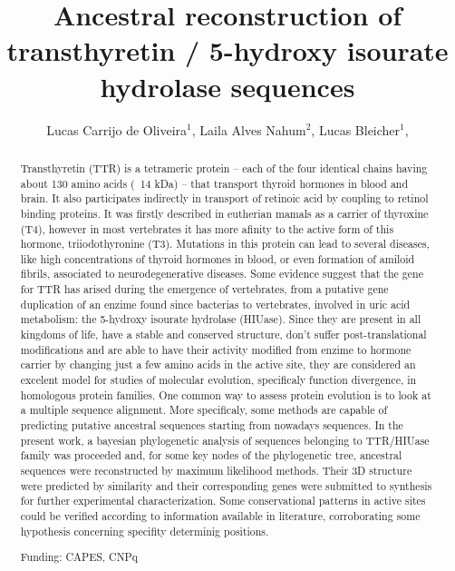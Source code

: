 \documentclass[twoside]{article}
\title{\vspace{-15mm}\fontsize{24pt}{10pt}\selectfont\textbf{ Ancestral reconstruction of transthyretin / 5-hydroxy isourate hydrolase sequences }} %
\author{ Lucas Carrijo de Oliveira$^{1}$, Laila Alves Nahum$^{2}$, Lucas Bleicher$^{1}$, }
\affil{ 1 Federal University of Minas Gerais

2 CPqRR/Fiocruz Minas

 }
\date{}
\begin{document}
  
  
  \maketitle %
  
  
  \thispagestyle{fancy} %
  
  
  \begin{abstract}
  Transthyretin (TTR) is a tetrameric protein – each of the four identical chains having about 130 amino acids (~14 kDa) –  that transport thyroid hormones in blood and brain. It also participates indirectly in transport of retinoic acid by coupling to retinol binding proteins. It was firstly described in eutherian mamals as a carrier of thyroxine (T4), however in most vertebrates it has more afinity to the active form of this hormone, triiodothyronine (T3). Mutations in this protein can lead to several diseases, like high concentrations of thyroid hormones in blood, or even formation of amiloid fibrils, associated to neurodegenerative diseases. Some evidence suggest that the gene for TTR has arised during the emergence of vertebrates, from a putative gene duplication of an enzime found since bacterias to vertebrates, involved in uric acid metabolism: the 5-hydroxy isourate hydrolase (HIUase). Since they are present in all kingdoms of life, have a stable and conserved structure, don't suffer post-translational modifications and are able to have their activity modified from enzime to hormone carrier by changing just a few amino acids in the active site, they are considered an excelent model for studies of molecular evolution, specificaly function divergence, in homologous protein families. One common way to assess protein evolution is to look at a multiple sequence alignment. More specificaly, some methods are capable of predicting putative ancestral sequences starting from nowadays sequences. In the present work, a bayesian phylogenetic analysis of sequences belonging to TTR/HIUase family was proceeded and, for some key nodes of the phylogenetic tree, ancestral sequences were reconstructed by maximum likelihood methods. Their 3D structure were predicted by similarity and their corresponding genes were submitted to synthesis for further experimental characterization. Some conservational patterns in active sites could be verified according to information available in literature, corroborating some hypothesis concerning specifity determinig positions.
  
  Funding: CAPES, CNPq \\ 
  \end{abstract}
  
\end{document}
